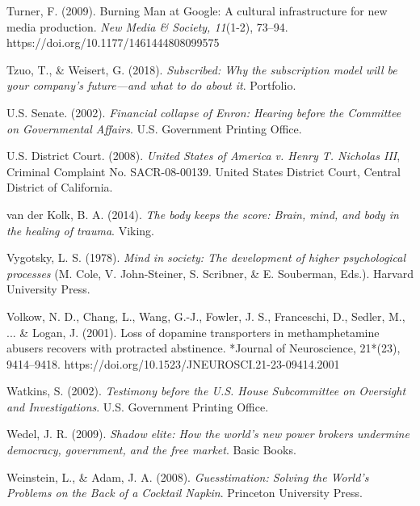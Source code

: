 \begin{thebibliography}{}
    Turner, F. (2009). Burning Man at Google: A cultural infrastructure for new media production. \textit{New Media \& Society, 11}(1-2), 73–94. https://doi.org/10.1177/1461444808099575

    Tzuo, T., \& Weisert, G. (2018). \textit{Subscribed: Why the subscription model will be your company's future—and what to do about it}. Portfolio.


    U.S. Senate. (2002). \textit{Financial collapse of Enron: Hearing before the Committee on Governmental Affairs}. U.S. Government Printing Office.

    U.S. District Court. (2008). \textit{United States of America v. Henry T. Nicholas III}, Criminal Complaint No. SACR-08-00139. United States District Court, Central District of California.


    van der Kolk, B. A. (2014). \textit{The body keeps the score: Brain, mind, and body in the healing of trauma}. Viking.

    Vygotsky, L. S. (1978). \textit{Mind in society: The development of higher psychological processes} (M. Cole, V. John-Steiner, S. Scribner, \& E. Souberman, Eds.). Harvard University Press.

    Volkow, N. D., Chang, L., Wang, G.-J., Fowler, J. S., Franceschi, D., Sedler, M., ... \& Logan, J. (2001). Loss of dopamine transporters in methamphetamine abusers recovers with protracted abstinence. *Journal of Neuroscience, 21*(23), 9414–9418. https://doi.org/10.1523/JNEUROSCI.21-23-09414.2001

    
    Watkins, S. (2002). \textit{Testimony before the U.S. House Subcommittee on Oversight and Investigations}. U.S. Government Printing Office.

    Wedel, J. R. (2009). \textit{Shadow elite: How the world's new power brokers undermine democracy, government, and the free market}. Basic Books.

    Weinstein, L., \& Adam, J. A. (2008). \textit{Guesstimation: Solving the World's Problems on the Back of a Cocktail Napkin}. Princeton University Press.


\end{thebibliography}

